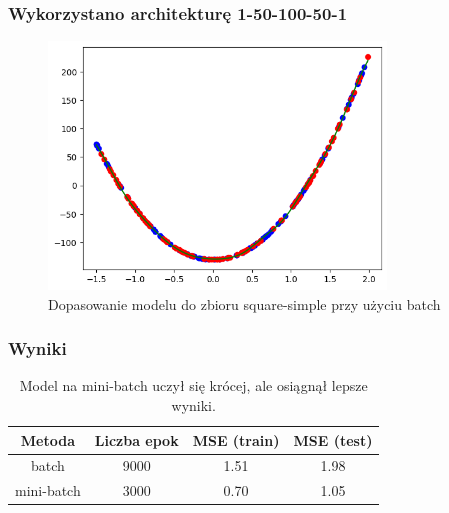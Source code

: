 \documentclass{article}
\begin{document}
\subsubsection*{Wykorzystano architekturę 1-50-100-50-1}
\begin{figure}[H]
    \centering
    \includegraphics[width=0.8\textwidth]{img/nn2/square-simple_batch_training_fit.png}
    \caption{Dopasowanie modelu do zbioru square-simple przy użyciu batch}
\end{figure}

\subsubsection*{Wyniki}
\begin{table}[H]
    \centering
    \begin{tabular}{|c|c|c|c|}
        \hline
        Metoda & Liczba epok & MSE (train) & MSE (test) \\
        \hline
        batch & 9000 & 1.51 & 1.98 \\
        mini-batch & 3000 & 0.70 & 1.05 \\
        \hline
    \end{tabular}
    \caption{Model na mini-batch uczył się krócej, ale osiągnął lepsze wyniki.}
\end{table}
\end{document}
